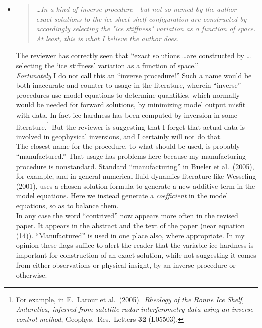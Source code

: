 \documentclass[11pt,reqno]{amsart}
\newcommand{\reply}[2]{
\medskip\medskip
\item  \begin{quote}
\emph{#1}
\end{quote}

\medskip
\noindent #2}
\begin{document}
\begin{itemize}
\reply{\dots In a kind of inverse procedure---but not so named by the author---exact solutions to the ice sheet-shelf configuration are constructed by accordingly selecting the "ice stiffness" variation as a function of space. At least, this is what I believe the author does.}
{The reviewer has correctly seen that ``exact solutions \dots are constructed by \dots selecting the `ice stiffness' variation as a function of space.'' \medskip \\
\emph{Fortunately} I do not call this an ``inverse procedure!''  Such a name would be both inaccurate and counter to usage in the literature, wherein ``inverse'' procedures use model equations to determine quantities, which normally would be needed for forward solutions, by minimizing model output misfit with data.  In fact ice hardness has been computed by inversion in some literature.\footnote{For example, in E.~Larour et al.~(2005).~\emph{Rheology of the Ronne Ice Shelf, Antarctica, inferred from satellite radar interferometry data using an inverse control method}, Geophys.~Res.~Letters \textbf{32} (L05503).}   But the reviewer is suggesting that I forget that actual data is involved in geophysical inversions, and I certainly will not do that. \medskip \\
The closest name for the procedure, to what should be used, is probably ``manufactured.''  That usage has problems here because my manufacturing procedure is nonstandard.  Standard ``manufacturing'' in Bueler et al.~(2005), for example, and in general numerical fluid dynamics literature like Wesseling (2001), uses a chosen solution formula to generate a new additive term in the model equations.  Here we instead generate a \emph{coefficient} in the model equations, so as to balance them. \medskip \\
In any case the word ``contrived'' now appears more often in the revised paper.  It appears in the abstract and the text of the paper (near equation (14)).  ``Manufactured'' is used in one place also, where appropriate.  In my opinion these flags suffice to alert the reader that the variable ice hardness is important for construction of an exact solution, while not suggesting it comes from either observations or physical insight, by an inverse procedure or otherwise.}


\end{itemize}
\end{document}
